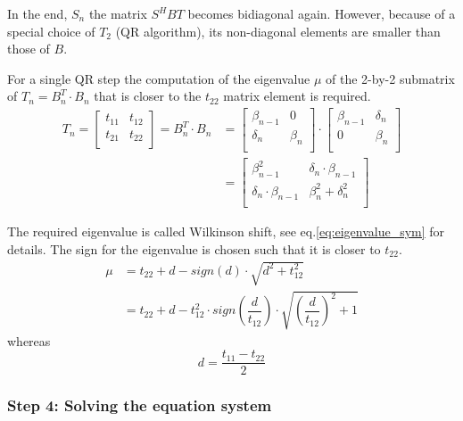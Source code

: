 \addvspace{12pt}

In the end, $S_n$ the matrix $S^H B T$ becomes bidiagonal again.
However, because of a special choice of $T_2$ (QR algorithm), its
non-diagonal elements are smaller than those of $B$.

\addvspace{12pt}

For a single QR step the computation of the eigenvalue $\mu$ of the
2-by-2 submatrix of $T_n = B_n^T\cdot B_n$ that is closer to the
$t_{22}$ matrix element is required.
\begin{align}
T_n =
\begin{bmatrix}
t_{11} & t_{12}\\
t_{21} & t_{22}\\
\end{bmatrix}
= B_n^T\cdot B_n &=
\begin{bmatrix}
\beta_{n-1} & 0\\
\delta_{n} & \beta_{n}\\
\end{bmatrix} \cdot
\begin{bmatrix}
\beta_{n-1} & \delta_{n}\\
0 & \beta_{n}\\
\end{bmatrix}\\
&=
\begin{bmatrix}
\beta_{n-1}^2 & \delta_{n}\cdot \beta_{n-1}\\
\delta_{n}\cdot \beta_{n-1} & \beta_{n}^2 + \delta_{n}^2\\
\end{bmatrix}
\end{align}

The required eigenvalue is called Wilkinson shift, see
eq.\eqref{eq:eigenvalue_sym} for details.  The sign for the eigenvalue
is chosen such that it is closer to $t_{22}$.
\begin{align}
\mu &= t_{22} + d - sign(d)\cdot \sqrt{d^2 + t_{12}^2}\\
&= t_{22} + d - t_{12}^2\cdot sign\left(\dfrac{d}{t_{12}}\right)\cdot \sqrt{\left(\dfrac{d}{t_{12}}\right)^2 + 1}
\end{align}
whereas
\begin{equation}
d = \dfrac{t_{11} - t_{22}}{2}
\end{equation}

\subsubsection{Step 4: Solving the equation system}

